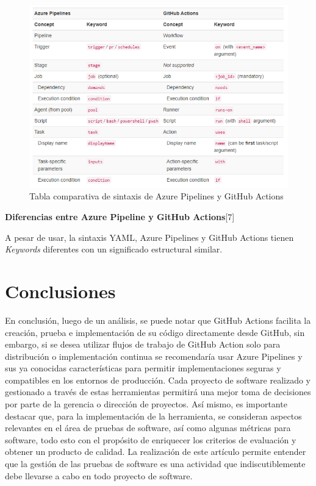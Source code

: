 \documentclass[twoside,twocolumn]{article}
\begin{document}
\begin{figure}[t]
    \begin{center}
        \includegraphics[width = \columnwidth]{./Imagenes/1 iwr4M9D-eSbMV8ki5xbU2w.png}
        \caption{Tabla comparativa de sintaxis de Azure Pipelines y GitHub Actions}
    \end{center}
\end{figure}

\textbf{Diferencias entre Azure Pipeline y GitHub Actions}[7]

A pesar de usar, la sintaxis YAML, Azure Pipelines y GitHub Actions tienen \textit{Keywords} diferentes con un significado estructural similar.




\newpage

\section{Conclusiones}

En conclusión, luego de un análisis, se puede notar que GitHub Actions facilita la creación, prueba e implementación de su código directamente desde GitHub, sin embargo, si se desea utilizar flujos de trabajo de GitHub Action solo para distribución o implementación continua se recomendaría usar Azure Pipelines y sus ya conocidas características para permitir implementaciones seguras y compatibles en los entornos de producción.
Cada proyecto de software realizado y gestionado a través de estas herramientas permitirá una mejor toma de decisiones por parte de la gerencia o dirección de proyectos.
Así mismo, es importante destacar que, para la implementación de la herramienta, se consideran aspectos relevantes en el área de pruebas de software, así como algunas métricas para software, todo esto con el propósito de enriquecer los criterios de evaluación y obtener un producto de calidad.
La realización de este artículo permite entender que la gestión de las pruebas de software es una actividad que indiscutiblemente debe llevarse a cabo en todo proyecto de software.
\end{document}
